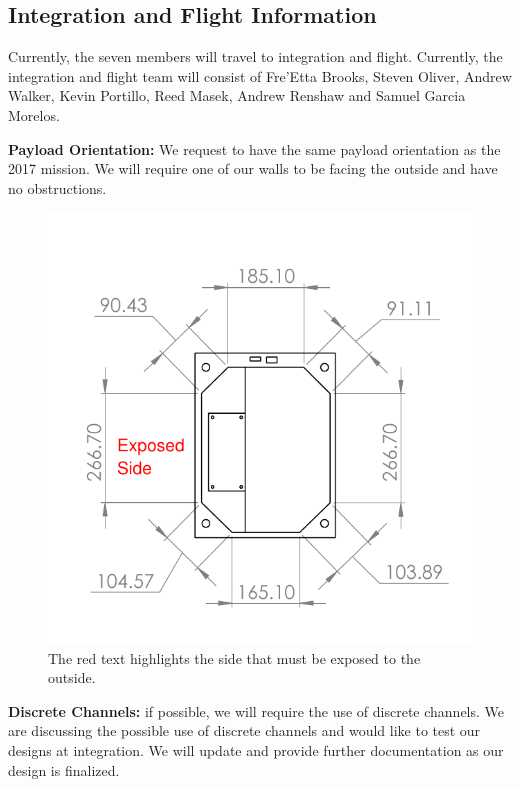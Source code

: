 \newpage
\subsection{Integration and Flight Information}

Currently, the seven members will travel to integration and flight.  Currently,
the integration and flight team will consist of Fre'Etta Brooks, Steven Oliver, Andrew Walker,
Kevin Portillo, Reed Masek, Andrew Renshaw and Samuel Garcia Morelos.

\textbf{Payload Orientation:} We request to have the same payload orientation as the 2017 mission.
We will require one of our walls to be facing the outside and have no obstructions.

\begin{figure}[!h]
\begin{center}
\includegraphics[scale=.7]{./Figures/PayloadTop.pdf}
\caption{The red text highlights the side that must be exposed to the outside.}
\label{fig:PayloadTop}
\end{center}
\end{figure}

\textbf{Discrete Channels:} if possible, we will require the use of discrete channels.
We are discussing the possible use of discrete channels and would like to test our designs at integration.
We will update and provide further documentation as our design is finalized.
